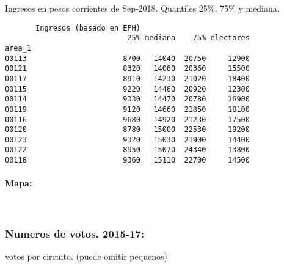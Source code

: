 \documentclass[11pt]{article}
\begin{document}
    
    Ingresos en pesos corrientes de Sep-2018. Quantiles 25\%, 75\% y
mediana.

    
    
    \begin{verbatim}
       Ingresos (basado en EPH)                         
                            25% mediana    75% electores
area_1                                                  
00113                      8700   14040  20750     12900
00121                      8320   14060  20360     15500
00117                      8910   14230  21020     18400
00115                      9220   14460  20920     12300
00114                      9330   14470  20780     16900
00119                      9120   14660  21850     18100
00116                      9680   14920  21230     17500
00120                      8780   15000  22530     19200
00123                      9320   15030  21900     14400
00122                      8950   15070  24340     13800
00118                      9360   15110  22700     14500
    \end{verbatim}

    
    \hypertarget{mapa}{%
\paragraph{Mapa:}\label{mapa}}

    
    \begin{center}
    \end{center}
    { \hspace*{\fill} \\}
    
    \hypertarget{numeros-de-votos.-2015-17}{%
\subsubsection{Numeros de votos.
2015-17:}\label{numeros-de-votos.-2015-17}}

    
    votos por circuito. (puede omitir pequenos)

    
    
\end{document}
